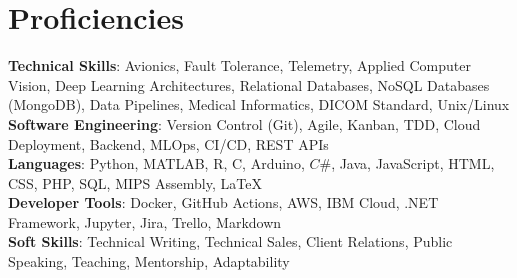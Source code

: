 \documentclass[letterpaper,10pt]{article}
\def\proficiencySpace{3pt}
\begin{document}
\section{Proficiencies}
\vspace{2pt}
 \begin{itemize}[leftmargin=0.15in, label={}]
    \small{\item{
     \textbf{Technical Skills}{: Avionics, Fault Tolerance, Telemetry, Applied Computer Vision, Deep Learning Architectures, Relational Databases, NoSQL Databases (MongoDB), Data Pipelines, Medical Informatics, DICOM Standard, Unix/Linux} \vspace{\proficiencySpace} \\ 
     \textbf{Software Engineering}{: Version Control (Git), Agile, Kanban, TDD, Cloud Deployment, Backend, MLOps, CI/CD, REST APIs} \vspace{\proficiencySpace} \\ 
     \textbf{Languages}{: Python, MATLAB, R, C, Arduino, $C\#$, Java, JavaScript, HTML, CSS, PHP, SQL, MIPS Assembly, LaTeX} \vspace{\proficiencySpace} \\
     \textbf{Developer Tools}{: Docker, GitHub Actions, AWS, IBM Cloud, .NET Framework, Jupyter, Jira, Trello, Markdown} \vspace{\proficiencySpace} \\
     \textbf{Soft Skills}{: Technical Writing, Technical Sales, Client Relations, Public Speaking, Teaching, Mentorship, Adaptability}
    }}
 \end{itemize}
\end{document}
